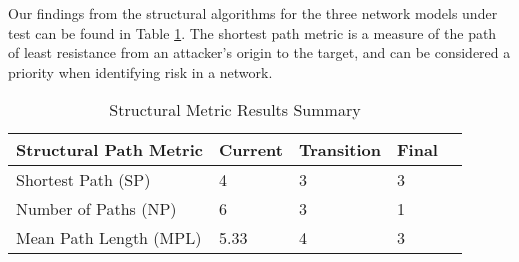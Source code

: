 Our findings from the structural algorithms for the three network models under test can be found in Table \ref{tab:sp_results}. The shortest path metric is a measure of the path of least resistance from an attacker's origin to the target, and can be considered a priority when identifying risk in a network. %

\begin{table}[H]
\caption{Structural Metric Results Summary}
\begin{tabular}{@{}lllll@{}}
\toprule
Structural Path Metric & Current & Transition & Final &  \\ \midrule
Shortest Path (SP) & 4 & 3 & 3 &  \\
Number of Paths (NP) & 6 & 3 & 1 &  \\
Mean Path Length (MPL) & 5.33 & 4 & 3 &  \\ \bottomrule
\end{tabular}
\label{tab:sp_results}
\end{table}